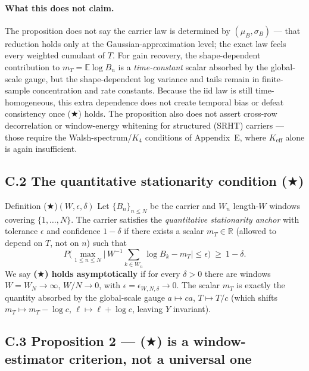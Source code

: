 \paragraph{What this does not claim.} The proposition does not say the carrier law is determined by $(\mu_B,\sigma_B)$ --- that reduction holds only at the Gaussian-approximation level; the exact law feels every weighted cumulant of $T$. For gain recovery, the shape-dependent contribution to $m_T=\mathbb{E}\log B_n$ is a \emph{time-constant} scalar absorbed by the global-scale gauge, but the shape-dependent log variance and tails remain in finite-sample concentration and rate constants. Because the iid law is still time-homogeneous, this extra dependence does not create temporal bias or defeat consistency once ($\bigstar$) holds. The proposition also does not assert cross-row decorrelation or window-energy whitening for structured (SRHT) carriers --- those require the Walsh-spectrum/$K_4$ conditions of Appendix~E, where $K_{\mathrm{eff}}$ alone is again insufficient.

\subsection{C.2 The quantitative stationarity condition (\texorpdfstring{$\bigstar$}{*})}

\begin{nameddef}{Definition ($\bigstar$)$(W,\epsilon,\delta)$}
Let $\{B_n\}_{n\le N}$ be the carrier and $W_n$ length-$W$ windows covering $\{1,\dots,N\}$. The carrier satisfies the \emph{quantitative stationarity anchor} with tolerance $\epsilon$ and confidence $1-\delta$ if there exists a scalar $m_T\in\mathbb R$ (allowed to depend on $T$, not on $n$) such that
\[
P\Big(\max_{1\le n\le N}\Big|\,W^{-1}\!\!\sum_{k\in W_n}\log B_k-m_T\Big|\le \epsilon\Big)\ \ge\ 1-\delta .
\]
We say \textbf{($\bigstar$) holds asymptotically} if for every $\delta>0$ there are windows $W=W_N\to\infty$, $W/N\to0$, with $\epsilon=\epsilon_{W,N,\delta}\to0$. The scalar $m_T$ is exactly the quantity absorbed by the global-scale gauge $a\mapsto ca$, $T\mapsto T/c$ (which shifts $m_T\mapsto m_T-\log c$, $\ell\mapsto\ell+\log c$, leaving $Y$ invariant).
\end{nameddef}

\subsection{C.3 Proposition 2 --- (\texorpdfstring{$\bigstar$}{*}) is a window-estimator criterion, not a universal one}

